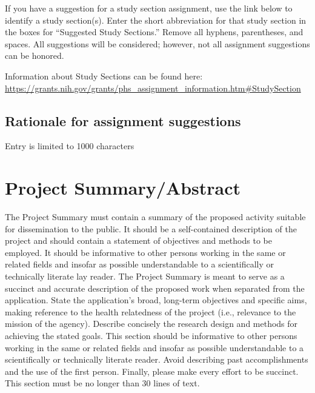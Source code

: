 \documentclass[12pt]{article}
\newcommand{\instructions}[1]{}
\renewcommand{\instructions}[1]{{\scriptsize \sc #1}}
\begin{document}
\instructions{If you have a suggestion for a study section assignment, use the link below to identify a study section(s). Enter the short abbreviation for that study section in the boxes for ``Suggested
Study Sections.'' Remove all hyphens, parentheses, and spaces. All suggestions will be considered; however, not all assignment suggestions can be honored.

Information about Study Sections can be found here: \url{https://grants.nih.gov/grants/phs_assignment_information.htm\#StudySection}}

\subsection*{Rationale for assignment suggestions}

\instructions{Entry is limited to 1000 characters}



\clearpage
\section*{Project Summary/Abstract}

\instructions{ The Project Summary must contain a summary of the
    proposed activity suitable for dissemination to the public. It
    should be a self-contained description of the project and should
    contain a statement of objectives and methods to be employed. It
    should be informative to other persons working in the same or
    related fields and insofar as possible understandable to a
    scientifically or technically literate lay reader.  The Project
    Summary is meant to serve as a succinct and accurate description
    of the proposed work when separated from the application. State
    the application's broad, long-term objectives and specific aims,
    making reference to the health relatedness of the project (i.e.,
    relevance to the mission of the agency). Describe concisely the
    research design and methods for achieving the stated goals. This
    section should be informative to other persons working in the same
    or related fields and insofar as possible understandable to a
    scientifically or technically literate reader. Avoid describing
    past accomplishments and the use of the first person. Finally,
    please make every effort to be succinct. This section must be no
    longer than 30 lines of text.}


\clearpage
\end{document}
